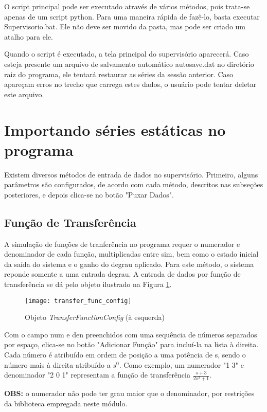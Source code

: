 O script principal pode ser executado através de vários métodos, pois trata-se apenas de um script python. Para uma maneira rápida de fazê-lo, basta executar Supervisorio.bat. Ele não deve ser movido da pasta, mas pode ser criado um atalho para ele.

Quando o script é executado, a tela principal do supervisório aparecerá. Caso esteja presente um arquivo de salvamento automático autosave.dat no diretório raiz do programa, ele tentará restaurar as séries da sessão anterior. Caso apareçam erros no trecho que carrega estes dados, o usuário pode tentar deletar este arquivo.

\section{Importando séries estáticas no programa}

Existem diversos métodos de entrada de dados no supervisório. Primeiro, alguns parâmetros são configurados, de acordo com cada método, descritos nas subseções posteriores, e depois clica-se no botão "Puxar Dados".

\subsection{Função de Transferência}

A simulação de funções de tranferência no programa requer o numerador e denominador de cada função, multiplicadas entre sim, bem como o estado inicial da saída do sistema e o ganho do degrau aplicado. Para este método, o sistema reponde somente a uma entrada degrau. A entrada de dados por função de transferência se dá pelo objeto ilustrado na Figura \ref{img_transfer_func_config}.

\begin{figure}[!htb]
	\centering
	\caption{Objeto \emph{TransferFunctionConfig} (à esquerda)}
	\texttt{[image: transfer\_func\_config]}
	\label{img_transfer_func_config}
\end{figure}

Com o campo num e den preenchidos com uma sequência de números separados por espaço, clica-se no botão "Adicionar Função" para incluí-la na lista à direita. Cada número é atribuído em ordem de posição a uma potência de s, sendo o número mais à direita atribuído a $s^0$. Como exemplo, um numerador "1 3" e denominador "2 0 1" representam a função de transferência $\frac{s + 3}{2s^2 + 1}$.

\textbf{OBS:} o numerador não pode ter grau maior que o denominador, por restrições da biblioteca empregada neste módulo.

